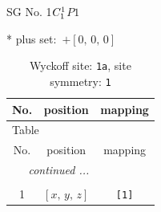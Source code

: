 \documentclass[fleqn,8pt]{jsarticle}
\begin{document}
\setcounter{MaxMatrixCols}{32}

\renewcommand{\tablename}{Table~}
\renewcommand{\figurename}{Figure~}
\begin{center}
\LARGE
SG No. 1\quad$C_{\rm 1}^{1}$\quad$P1$\quad[ triclinic ]
\end{center}
* plus set:\,\,\,$+\left[ 0,\, 0,\, 0 \right]$
\renewcommand{\arraystretch}{1.2}
\begin{longtable}{ccc}
\caption{Wyckoff site: {\tt 1a}, site symmetry: {\tt 1}}
 \\
 \hline \hline
No. & position & mapping \\ \hline \endfirsthead

\multicolumn{2}{l}{\tablename\ \thetable{}} \\
 \hline \hline
No. & position & mapping \\ \hline \endhead

 \hline \hline
\multicolumn{2}{r}{\footnotesize\it continued ...} \\ \endfoot

 \hline \hline
\multicolumn{2}{r}{} \\ \endlastfoot

1 & $\left[ x,\, y,\, z \right]$ & {\tt [1]} \\
\end{longtable}
\end{document}
